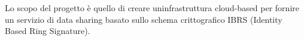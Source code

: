 Lo scopo del progetto è quello di creare un\textquotesingle{}infrastruttura cloud-\/based per fornire un servizio di data sharing basato sullo schema crittografico I\+B\+RS (Identity Based Ring Signature). 